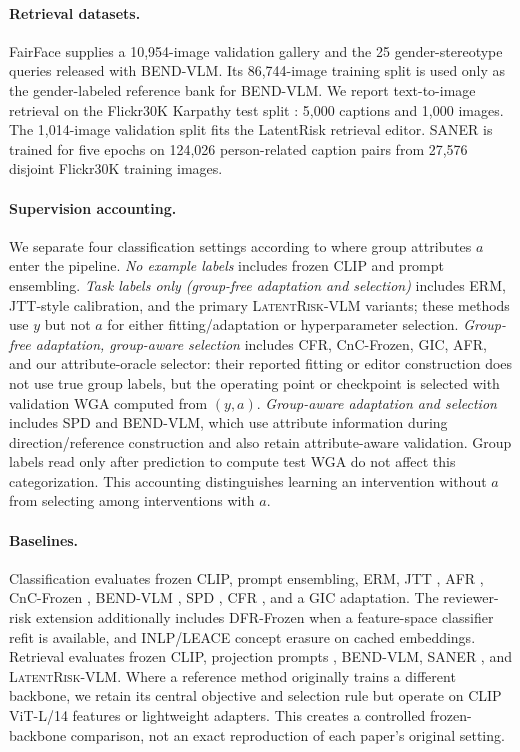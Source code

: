 \paragraph{Retrieval datasets.}
FairFace \citep{karkkainen2021fairface} supplies a 10,954-image validation gallery and the 25 gender-stereotype queries released with BEND-VLM. Its 86,744-image training split is used only as the gender-labeled reference bank for BEND-VLM. We report text-to-image retrieval on the Flickr30K \citep{young2014image} Karpathy test split \citep{karpathy2015deep}: 5,000 captions and 1,000 images. The 1,014-image validation split fits the LatentRisk retrieval editor. SANER is trained for five epochs on 124,026 person-related caption pairs from 27,576 disjoint Flickr30K training images.

\paragraph{Supervision accounting.}
We separate four classification settings according to where group attributes $a$ enter the pipeline. \emph{No example labels} includes frozen CLIP and prompt ensembling. \emph{Task labels only (group-free adaptation and selection)} includes ERM, JTT-style calibration, and the primary \textsc{LatentRisk-VLM} variants; these methods use $y$ but not $a$ for either fitting/adaptation or hyperparameter selection. \emph{Group-free adaptation, group-aware selection} includes CFR, CnC-Frozen, GIC, AFR, and our attribute-oracle selector: their reported fitting or editor construction does not use true group labels, but the operating point or checkpoint is selected with validation WGA computed from $(y,a)$. \emph{Group-aware adaptation and selection} includes SPD and BEND-VLM, which use attribute information during direction/reference construction and also retain attribute-aware validation. Group labels read only after prediction to compute test WGA do not affect this categorization. This accounting distinguishes learning an intervention without $a$ from selecting among interventions with $a$.

\paragraph{Baselines.}
Classification evaluates frozen CLIP, prompt ensembling, ERM, JTT \citep{liu2021jtt}, AFR \citep{qiu2023afr}, CnC-Frozen \citep{zhang2022correct}, BEND-VLM \citep{gerych2024bendvlm}, SPD \citep{zhao2026subspace}, CFR \citep{you2024calibrating}, and a GIC adaptation. The reviewer-risk extension additionally includes DFR-Frozen \citep{kirichenko2023dfr} when a feature-space classifier refit is available, and INLP/LEACE concept erasure on cached embeddings. Retrieval evaluates frozen CLIP, projection prompts \citep{chuang2023debiasing}, BEND-VLM, SANER \citep{hirota2025saner}, and \textsc{LatentRisk-VLM}. Where a reference method originally trains a different backbone, we retain its central objective and selection rule but operate on CLIP ViT-L/14 features or lightweight adapters. This creates a controlled frozen-backbone comparison, not an exact reproduction of each paper's original setting.

